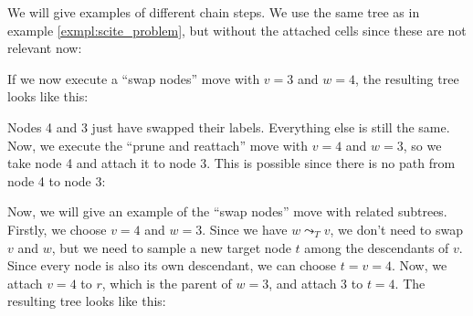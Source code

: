 \begin{example}
    \label{exmpl:chain_step}
    We will give examples of different chain steps. We use the same tree as in example \ref{exmpl:scite_problem}, but without the attached cells since these are not relevant now:
    \begin{center}
    \end{center}
    If we now execute a ``swap nodes'' move with $v = 3$ and $w = 4$, the resulting tree looks like this:
    \begin{center}
    \end{center}
    Nodes 4 and 3 just have swapped their labels. Everything else is still the same. Now, we execute the ``prune and reattach'' move with $v = 4$ and $w = 3$, so we take node 4 and attach it to node 3. This is possible since there is no path from node 4 to node 3:
    \begin{center}
    \end{center}
    Now, we will give an example of the ``swap nodes'' move with related subtrees. Firstly, we choose $v = 4$ and $w = 3$. Since we have $w \leadsto_T v$, we don't need to swap $v$ and $w$, but we need to sample a new target node $t$ among the descendants of $v$. Since every node is also its own descendant, we can choose $t = v = 4$. Now, we attach $v = 4$ to $r$, which is the parent of $w = 3$, and attach 3 to $t = 4$. The resulting tree looks like this:

\end{example}
